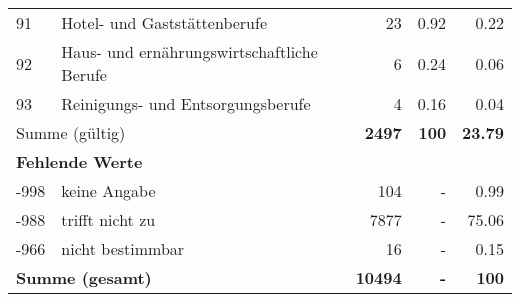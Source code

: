 \begin{longtable}{lXrrr}
        91 & \multicolumn{1}{X}{Hotel- und Gaststättenberufe} & %
          \num{23} &
          \num[round-mode=places,round-precision=2]{0,92} &
          \num[round-mode=places,round-precision=2]{0,22} \\

        92 & \multicolumn{1}{X}{Haus- und ernährungswirtschaftliche Berufe} & %
          \num{6} &
          \num[round-mode=places,round-precision=2]{0,24} &
          \num[round-mode=places,round-precision=2]{0,06} \\

        93 & \multicolumn{1}{X}{Reinigungs- und Entsorgungsberufe} & %
          \num{4} &
          \num[round-mode=places,round-precision=2]{0,16} &
          \num[round-mode=places,round-precision=2]{0,04} \\

     \midrule
     \multicolumn{2}{l}{Summe (gültig)} &
       \textbf{\num{2497}} &
     \textbf{100} &
       \textbf{\num[round-mode=places,round-precision=2]{23,79}} \\
     \multicolumn{5}{l}{\textbf{Fehlende Werte}}\\
       -998 &
       keine Angabe &
         \num{104} &
        - &
         \num[round-mode=places,round-precision=2]{0,99} \\
       -988 &
       trifft nicht zu &
         \num{7877} &
        - &
         \num[round-mode=places,round-precision=2]{75,06} \\
       -966 &
       nicht bestimmbar &
         \num{16} &
        - &
         \num[round-mode=places,round-precision=2]{0,15} \\
     \midrule
     \multicolumn{2}{l}{\textbf{Summe (gesamt)}} &
          \textbf{\num{10494}} &
        \textbf{-} &
        \textbf{100} \\
     \bottomrule
     \end{longtable}
     
